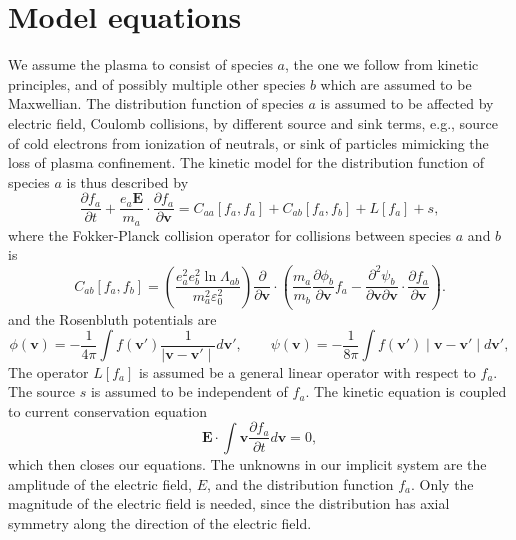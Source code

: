 \documentclass[reprint]{revtex4}
\begin{document}
\section{Model equations}
We assume the plasma to consist of species $a$, the one we follow from kinetic principles, and of possibly multiple other species $b$ which are assumed to be Maxwellian. The distribution function of species $a$ is assumed to be affected by electric field, Coulomb collisions, by different source and sink terms, e.g., source of cold electrons from ionization of neutrals, or sink of particles mimicking the loss of plasma confinement. The kinetic model for the distribution function of species $a$ is thus described by 
\begin{equation}
\frac{\partial f_a}{\partial t} + \frac{e_a\bm{E}}{m_a}\cdot\frac{\partial f_a}{\partial\bm{v}}= C_{aa}[f_a,f_a]+C_{ab}[f_a,f_b]+L[f_a]+s,
\end{equation}
where the Fokker-Planck collision operator for collisions between species $a$ and $b$ is 
\begin{equation}
C_{ab}[f_a,f_b]=\left(\frac{e_a^2e_b^2\ln\Lambda_{ab}}{m_a^2\varepsilon_0^2}\right)\frac{\partial}{\partial\bm{v}}\cdot\left(\frac{m_a}{m_b}\frac{\partial\phi_b}{\partial\bm{v}} f_a-\frac{\partial^2\psi_b}{\partial\bm{v}\partial\bm{v}}\cdot\frac{\partial f_a}{\partial\bm{v}}\right).
\end{equation}
and the Rosenbluth potentials are
\begin{equation}
\phi(\bm{v})=-\frac{1}{4\pi}\int f(\bm{v}')\frac{1}{\mid \bm{v}-\bm{v}'\mid}d\bm{v}',\qquad \psi(\bm{v})=-\frac{1}{8\pi}\int f(\bm{v}')\mid \bm{v}-\bm{v}'\mid d\bm{v}',
\end{equation}
The operator $L[f_a]$ is assumed be a general linear operator with respect to $f_a$. The source $s$ is assumed to be independent of $f_a$. The kinetic equation is coupled to current conservation equation
\begin{equation}
\bm{E}\cdot\int \bm{v}\frac{\partial f_a}{\partial t}d\bm{v}=0,
\end{equation}
which then closes our equations. The unknowns in our implicit system are the amplitude of the electric field, $E$, and the distribution function $f_a$. Only the magnitude of the electric field is needed, since the distribution has axial symmetry along the direction of the electric field.
\end{document}
